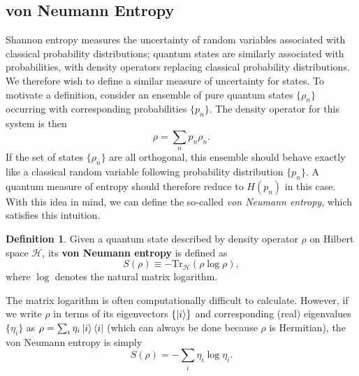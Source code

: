 \documentclass[12pt,a4paper]{report}
\numberwithin{equation}{section}
\newcommand{\ketbra}[2]{\ket{#1}\bra{#2}}
\newcommand{\ketbras}[1]{\ketbra{#1}{#1}}
\newcommand{\tr}{\text{Tr}}
\theoremstyle{definition}
\newtheorem{definition}{Definition}[section]
\theoremstyle{theorem}
\theoremstyle{theorem}
\theoremstyle{example}
\theoremstyle{definition}
\begin{document}
\subsection{von Neumann Entropy}
Shannon entropy measures the uncertainty of random variables associated with classical probability distributions; quantum states are similarly associated with probabilities, with density operators replacing classical probability distributions. We therefore wish to define a similar measure of uncertainty for states. To motivate a definition, consider an ensemble of pure quantum states $\{\rho_{n}\}$ occurring with corresponding probabilities $\{p_n\}$. The density operator for this system is then
\begin{equation}
	\rho=\sum_{n}p_{n}\rho_{n}.
\end{equation}
If the set of states $\{\rho_{n}\}$ are all orthogonal, this ensemble should behave exactly like a classical random variable following probability distribution $\{p_{n}\}$. A quantum measure of entropy should therefore reduce to $H(p_{n})$ in this case. With this idea in mind, we can define the so-called \textit{von Neumann entropy}, which satisfies this intuition.
\begin{definition}
	Given a quantum state described by density operator $\rho$ on Hilbert space $\mathcal{H}$, its \textbf{von Neumann entropy} is defined as
	\begin{equation}
		S(\rho)\equiv -\tr_{\mathcal{H}}\left(\rho\log{\rho}\right),
	\end{equation}
	where $\log$ denotes the natural matrix logarithm.
\end{definition}
The matrix logarithm is often computationally difficult to calculate. However, if we write $\rho$ in terms of its eigenvectors $\{\ket{i}\}$ and corresponding (real) eigenvalues $\{\eta_{i}\}$ as $\rho=\sum_{i}\eta_{i}\ketbras{i}$ (which can always be done because $\rho$ is Hermitian), the von Neumann entropy is simply
\begin{equation}
	S(\rho)=-\sum_{i}\eta_{i}\log\eta_{i}.
\end{equation}
\end{document}

